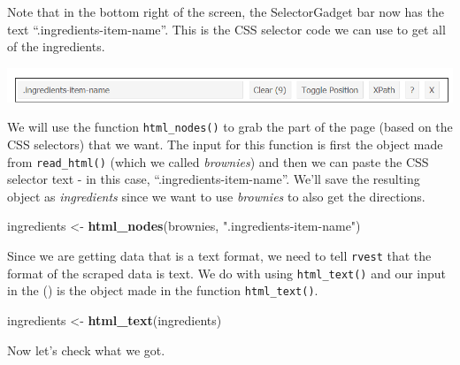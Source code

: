 \documentclass[
  12pt,
]{book}
\newenvironment{Shaded}{\begin{snugshade}}{\end{snugshade}}
\newcommand{\KeywordTok}[1]{\textcolor[rgb]{0.27,0.27,0.27}{\textbf{#1}}}
\newcommand{\NormalTok}[1]{#1}
\newcommand{\StringTok}[1]{\textcolor[rgb]{0.5,0.5,0.5}{#1}}
\begin{document}
Note that in the bottom right of the screen, the SelectorGadget bar now has the text ``.ingredients-item-name''. This is the CSS selector code we can use to get all of the ingredients.

\includegraphics{images/brownies_4.PNG}

We will use the function \texttt{html\_nodes()} to grab the part of the page (based on the CSS selectors) that we want. The input for this function is first the object made from \texttt{read\_html()} (which we called \emph{brownies}) and then we can paste the CSS selector text - in this case, ``.ingredients-item-name''. We'll save the resulting object as \emph{ingredients} since we want to use \emph{brownies} to also get the directions.

\begin{Shaded}
\begin{Highlighting}[]
\NormalTok{ingredients \textless{}{-}}\StringTok{ }\KeywordTok{html\_nodes}\NormalTok{(brownies, }\StringTok{".ingredients{-}item{-}name"}\NormalTok{)}
\end{Highlighting}
\end{Shaded}

Since we are getting data that is a text format, we need to tell \texttt{rvest} that the format of the scraped data is text. We do with using \texttt{html\_text()} and our input in the () is the object made in the function \texttt{html\_text()}.

\begin{Shaded}
\begin{Highlighting}[]
\NormalTok{ingredients \textless{}{-}}\StringTok{ }\KeywordTok{html\_text}\NormalTok{(ingredients)}
\end{Highlighting}
\end{Shaded}

Now let's check what we got.
\end{document}
